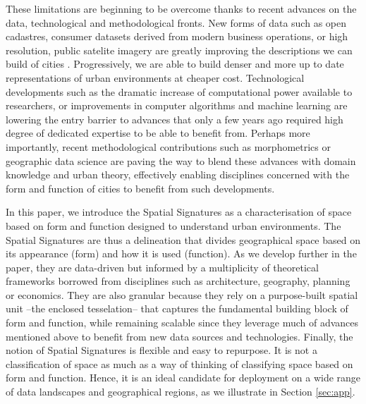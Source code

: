 These limitations are beginning to be overcome thanks to
recent advances on the data, technological and methodological fronts.
New forms of data such as open cadastres, consumer datasets derived from
modern business operations, or high resolution, public satelite imagery are
greatly improving the descriptions we can build of cities
\citep{arribas2014accidental}. Progressively, we are able to build denser and
more up to date representations of urban environments at cheaper cost.
Technological developments such as the dramatic increase of computational
power available to researchers, or improvements in computer algorithms and machine
learning are lowering the entry barrier to advances that only a few years ago
required high degree of dedicated expertise to be able to benefit from.
Perhaps more importantly, recent methodological contributions such as
morphometrics \citep{dibble2016urban} or geographic data science
\citep{singleton2021geographic} are paving the way to blend these advances
with domain knowledge and urban theory, effectively enabling disciplines
concerned with the form and function of cities to benefit from such
developments.

In this paper, we introduce the Spatial Signatures as a characterisation of
space based on form and function designed to understand urban environments.
The Spatial Signatures are thus a delineation that divides geographical space
based on its appearance (form) and how it is used (function).
As we develop further in the paper, they are data-driven but informed by
a multiplicity of theoretical frameworks borrowed from disciplines such as
architecture, geography, planning or economics.
They are also granular because they rely on a purpose-built spatial unit --the
enclosed tesselation-- that captures the fundamental building block of form
and function, while remaining scalable since they leverage much of advances
mentioned above to benefit from new data sources and technologies.
Finally, the notion of Spatial Signatures is flexible and easy to repurpose.
It is not a classification of space as much as a way of thinking of
classifying space based on form and function. Hence, it is an ideal candidate
for deployment on a wide range of data landscapes and geographical regions, as
we illustrate in Section \ref{sec:app}.

